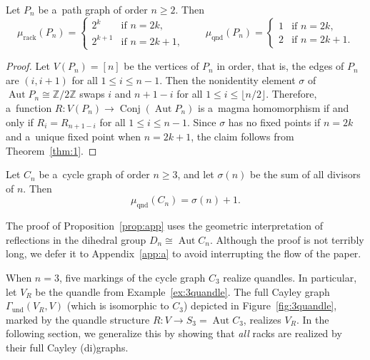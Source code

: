 \documentclass{jonasart}
\DeclareMathOperator{\Aut}{Aut}
\DeclareMathOperator{\Conj}{Conj}
\DeclareMathOperator{\qnd}{qnd}
\DeclareMathOperator{\rack}{rack}
\newcommand{\und}{\mathrm{und}}
\newcommand{\Z}{\mathbb{Z}}
\begin{document}
	\begin{proposition}
		Let $P_n$ be a~path graph of order $n\geq 2$. Then
		\[
			\mu_{\rack}(P_n)=\begin{cases}
                2^k&\text{if }n=2k,\\
                2^{k+1}& \text{if }n=2k+1,\end{cases}\qquad \mu_{\qnd}(P_n)=\begin{cases}
                1&\text{if }n=2k,\\
               2& \text{if }n=2k+1.
           \end{cases}
		\]
	\end{proposition}

	\begin{proof}
		Let $V(P_n )=[n]$ be the vertices of $P_n$ in order, that is, the edges of $P_n$ are $(i,i+1)$ for all $1\leq i\leq n-1$. Then the nonidentity element $\sigma$ of $\Aut P_n\cong \Z/2\Z$ swaps $i$ and $n+1-i$ for all $1\leq i\leq \lfloor n/2\rfloor$. Therefore, a~function $R:V(P_n )\to\Conj(\Aut P_n )$ is a~magma homomorphism if and only if $R_i =R_{n+1-i}$ for all $1\leq i\leq n-1$. Since $\sigma$ has no fixed points if $n=2k$ and a~unique fixed point when $n=2k+1$, the claim follows from Theorem~\ref{thm:1}.
	\end{proof}

	\begin{proposition}\label{prop:app}
		Let $C_n$ be a~cycle graph of order $n\geq 3$, and let $\sigma(n)$ be the sum of all divisors of $n$. Then
		\[
			\mu_{\qnd}(C_n) = \sigma(n)+1.
		\]
	\end{proposition}
    
	The proof of Proposition~\ref{prop:app} uses the geometric interpretation of reflections in the dihedral group ${D_n\cong\Aut C_n}$. Although the proof is not terribly long, we defer it to Appendix~\ref{app:a} to avoid interrupting the flow of the paper.

	\begin{example}
		When $n=3$, five markings of the cycle graph $C_3$ realize quandles. In particular, let $V_R$ be the quandle from Example~\ref{ex:3quandle}. The full Cayley graph $\Gamma_{\und}(V_R,V)$ (which is isomorphic to $C_3$) depicted in Figure~\ref{fig:3quandle}, marked by the quandle structure $R:V\to S_3 =\Aut C_3$, realizes $V_R$. In the following section, we generalize this by showing that \emph{all} racks are realized by their full Cayley (di)graphs.
	\end{example}
\end{document}

